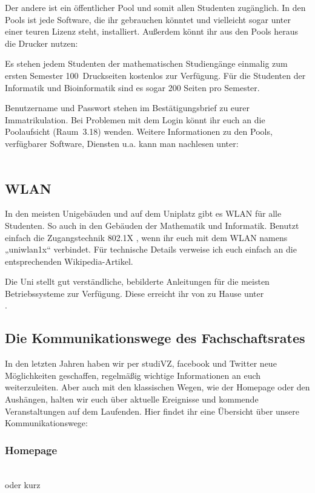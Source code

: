 Der andere ist ein öffentlicher Pool und somit allen Studenten zugänglich.
In den Pools ist jede Software, die ihr gebrauchen könntet und vielleicht sogar unter einer teuren Lizenz steht, installiert.
Außerdem könnt ihr aus den Pools heraus die Drucker nutzen:

Es stehen jedem Studenten der mathematischen Studiengänge einmalig zum ersten Semester 100~Druckseiten kostenlos zur Verfügung.
Für die Studenten der Informatik und Bioinformatik sind es sogar 200 Seiten pro Semester.

Benutzername und Passwort stehen im Bestätigungsbrief zu eurer Immatrikulation.
Bei Problemen mit dem Login könnt ihr euch an die Poolaufsicht (Raum~3.18) wenden.
Weitere Informationen zu den Pools, verfügbarer Software, Diensten u.a. kann man nachlesen unter:\\[1.0em]
\\ 

\subsection{WLAN}

In den meisten Unigebäuden und auf dem Uniplatz gibt es WLAN für alle Studenten.
So auch in den Gebäuden der Mathematik und Informatik.
Benutzt einfach die Zugangstechnik 802.1X , wenn ihr euch mit dem WLAN namens „uniwlan1x“ verbindet.
Für technische Details verweise ich euch einfach an die entsprechenden Wikipedia-Artikel.

Die Uni stellt gut verständliche, bebilderte Anleitungen für die meisten Betriebssysteme zur Verfügung.
Diese erreicht ihr von zu Hause unter\\
    .


\subsection[Kommunikationswege des FSR]{Die Kommunikationswege des Fachschaftsrates}
In den letzten Jahren haben wir per studiVZ, facebook und Twitter neue Mög\-lich\-kei\-ten geschaffen, regelmäßig wichtige Informationen an euch
weiterzuleiten.
Aber auch mit den klassischen Wegen, wie der Homepage oder den Aushängen, halten wir euch über aktuelle Ereignisse und kommende Veranstaltungen
auf dem Laufenden.
Hier findet ihr eine Übersicht über unsere Kommunikationswege:

\subsubsection{Homepage}
     \\
    oder kurz 
